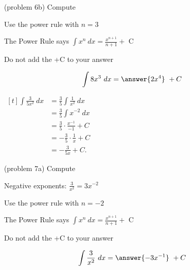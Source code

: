 \documentclass[handout]{ximera}
\begin{document}
\begin{problem}(problem 6b)
Compute 

\begin{hint}
Use the power rule with $n=3$
\end{hint}
\begin{hint}
The Power Rule says $\int x^n \ dx = \frac{x^{n+1}}{n+1} +$ C
\end{hint}
\begin{hint}
\begin{center}
Do not add the +C to your answer
\end{center}
\end{hint}

\[
\int 8x^3 \ dx =
\answer{2x^4} \ + C
\]
\end{problem}


\begin{example}[example 7]
$\begin{aligned}[t]
\int \frac{3}{5x^2} \ dx &= \frac{3}{5} \int \frac{1}{x^2} \ dx \\[3pt]
&=\frac{3}{5} \int x^{-2} \ dx \\[3pt]
&= \frac{3}{5} \cdot \frac{x^{-1}}{-1} +C \\[5pt]
&= -\frac{3}{5} \cdot \frac{1}{x} +C \\[5pt]
&= -\frac{3}{5x} +C.
\end{aligned}$
\end{example}


\begin{problem}(problem 7a)
Compute 

\begin{hint}
Negative exponents: $\frac{3}{x^2} = 3x^{-2}$
\end{hint}
\begin{hint}
Use the power rule with $n=-2$
\end{hint}
\begin{hint}
The Power Rule says $\int x^n \ dx = \frac{x^{n+1}}{n+1} +$ C
\end{hint}
\begin{hint}
\begin{center}
Do not add the +C to your answer
\end{center}
\end{hint}

\[
\int \frac{3}{x^2} \ dx =
\answer{-3x^{-1}} \ + C
\]
\end{problem}
\end{document}

